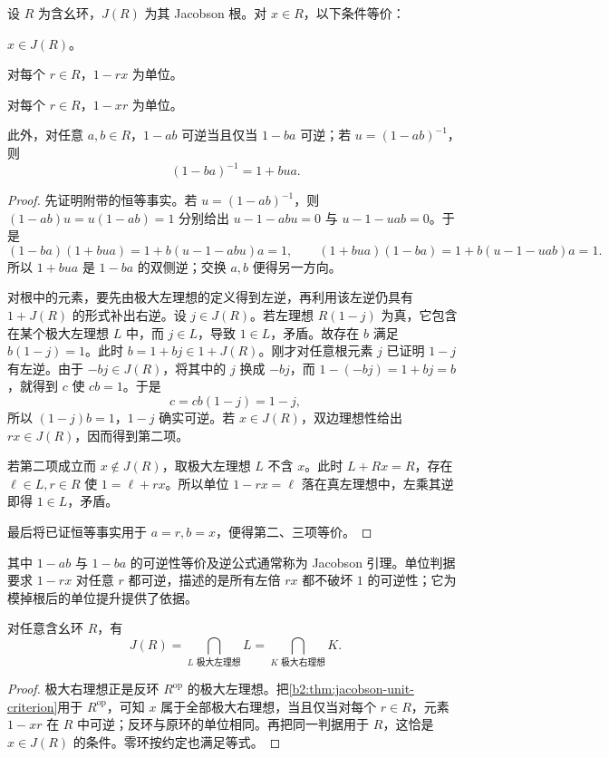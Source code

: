 \begin{theorem}[可逆性判据]\label{b2:thm:jacobson-unit-criterion}
	设 \(R\) 为含幺环，\(J(R)\) 为其 Jacobson 根。对 \(x\in R\)，以下条件等价：
	\begin{equivalences}
		\item\label{b2:item:radical-member} \(x\in J(R)\)。
		\item\label{b2:item:radical-unit-left} 对每个 \(r\in R\)，\(1-rx\) 为单位。
		\item\label{b2:item:radical-unit-right} 对每个 \(r\in R\)，\(1-xr\) 为单位。
	\end{equivalences}
	此外，对任意 \(a,b\in R\)，\(1-ab\) 可逆当且仅当 \(1-ba\) 可逆；若 \(u=(1-ab)^{-1}\)，则
	\[
		(1-ba)^{-1}=1+bua.
	\]
\end{theorem}
\begin{proof}
	先证明附带的恒等事实。若 \(u=(1-ab)^{-1}\)，则 \((1-ab)u=u(1-ab)=1\) 分别给出 \(u-1-abu=0\) 与 \(u-1-uab=0\)。于是
	\[
		(1-ba)(1+bua)=1+b(u-1-abu)a=1, \qquad (1+bua)(1-ba)=1+b(u-1-uab)a=1.
	\]
	所以 \(1+bua\) 是 \(1-ba\) 的双侧逆；交换 \(a,b\) 便得另一方向。

	对根中的元素，要先由极大左理想的定义得到左逆，再利用该左逆仍具有 \(1+J(R)\) 的形式补出右逆。设 \(j\in J(R)\)。若左理想 \(R(1-j)\) 为真，它包含在某个极大左理想 \(L\) 中，而 \(j\in L\)，导致 \(1\in L\)，矛盾。故存在 \(b\) 满足 \(b(1-j)=1\)。此时 \(b=1+bj\in1+J(R)\)。刚才对任意根元素 \(j\) 已证明 \(1-j\) 有左逆。由于 \(-bj\in J(R)\)，将其中的 \(j\) 换成 \(-bj\)，而 \(1-(-bj)=1+bj=b\)，就得到 \(c\) 使 \(cb=1\)。于是
	\[
		c=cb(1-j)=1-j,
	\]
	所以 \((1-j)b=1\)，\(1-j\) 确实可逆。若 \(x\in J(R)\)，双边理想性给出 \(rx\in J(R)\)，因而得到第二项。

	若第二项成立而 \(x\notin J(R)\)，取极大左理想 \(L\) 不含 \(x\)。此时 \(L+Rx=R\)，存在 \(\ell\in L,r\in R\) 使 \(1=\ell+rx\)。所以单位 \(1-rx=\ell\) 落在真左理想中，左乘其逆即得 \(1\in L\)，矛盾。

	最后将已证恒等事实用于 \(a=r,b=x\)，便得第二、三项等价。
\end{proof}

其中 \(1-ab\) 与 \(1-ba\) 的可逆性等价及逆公式通常称为 Jacobson 引理。单位判据要求 \(1-rx\) 对任意 \(r\) 都可逆，描述的是所有左倍 \(rx\) 都不破坏 \(1\) 的可逆性；它为模掉根后的单位提升提供了依据。

\begin{corollary}[根的左右对称性]\label{b2:cor:jacobson-left-right}
	对任意含幺环 \(R\)，有
	\[
		J(R)=\bigcap_{L\text{ 极大左理想}}L =\bigcap_{K\text{ 极大右理想}}K.
	\]
\end{corollary}
\begin{proof}
	极大右理想正是反环 \(R^{\mathrm{op}}\) 的极大左理想。把\cref{b2:thm:jacobson-unit-criterion}用于 \(R^{\mathrm{op}}\)，可知 \(x\) 属于全部极大右理想，当且仅当对每个 \(r\in R\)，元素 \(1-xr\) 在 \(R\) 中可逆；反环与原环的单位相同。再把同一判据用于 \(R\)，这恰是 \(x\in J(R)\) 的条件。零环按约定也满足等式。
\end{proof}

